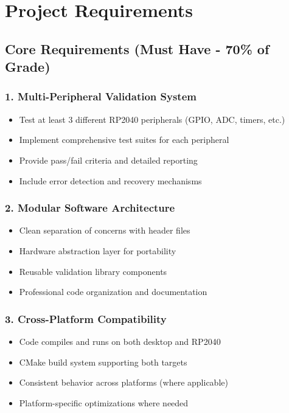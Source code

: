 \documentclass[11pt,a4paper]{article}
\begin{document}
\section{Project Requirements}

\subsection{Core Requirements (Must Have - 70\% of Grade)}

\subsubsection{1. Multi-Peripheral Validation System}
\begin{itemize}
    \item Test at least 3 different RP2040 peripherals (GPIO, ADC, timers, etc.)
    \item Implement comprehensive test suites for each peripheral
    \item Provide pass/fail criteria and detailed reporting
    \item Include error detection and recovery mechanisms
\end{itemize}

\subsubsection{2. Modular Software Architecture}
\begin{itemize}
    \item Clean separation of concerns with header files
    \item Hardware abstraction layer for portability
    \item Reusable validation library components
    \item Professional code organization and documentation
\end{itemize}

\subsubsection{3. Cross-Platform Compatibility}
\begin{itemize}
    \item Code compiles and runs on both desktop and RP2040
    \item CMake build system supporting both targets
    \item Consistent behavior across platforms (where applicable)
    \item Platform-specific optimizations where needed
\end{itemize}
\end{document}
